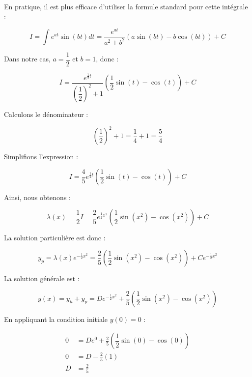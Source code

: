 \documentclass{article}
\begin{document}
En pratique, il est plus efficace d'utiliser la formule standard pour cette intégrale :

\begin{equation*}
I = \int e^{ a t } \sin( b t ) dt = \frac{ e^{ a t } }{ a^2 + b^2 } \left( a \sin( b t ) - b \cos( b t ) \right ) + C
\end{equation*}

Dans notre cas, \(a = \dfrac{1}{2}\) et \(b = 1\), donc :

\begin{equation*}
I = \frac{ e^{ \frac{1}{2} t } }{ \left( \dfrac{1}{2} \right)^2 + 1 } \left( \dfrac{1}{2} \sin( t ) - \cos( t ) \right ) + C
\end{equation*}

Calculons le dénominateur :

\begin{equation*}
\left( \dfrac{1}{2} \right)^2 + 1 = \dfrac{1}{4} + 1 = \dfrac{5}{4}
\end{equation*}

Simplifions l'expression :

\begin{equation*}
I = \frac{ 4 }{ 5 } e^{ \frac{1}{2} t } \left( \dfrac{1}{2} \sin( t ) - \cos( t ) \right ) + C
\end{equation*}

Ainsi, nous obtenons :

\begin{equation*}
\lambda(x) = \frac{1}{2} I = \frac{2}{5} e^{ \frac{1}{2} x^2 } \left( \dfrac{1}{2} \sin( x^2 ) - \cos( x^2 ) \right ) + C
\end{equation*}

La solution particulière est donc :

\begin{equation*}
y_p = \lambda(x) e^{ - \frac{1}{2} x^2 } = \frac{2}{5} \left( \dfrac{1}{2} \sin( x^2 ) - \cos( x^2 ) \right ) + C e^{ - \frac{1}{2} x^2 }
\end{equation*}

La solution générale est :

\begin{equation*}
y(x) = y_h + y_p = D e^{ - \frac{1}{2} x^2 } + \frac{2}{5} \left( \dfrac{1}{2} \sin( x^2 ) - \cos( x^2 ) \right )
\end{equation*}

En appliquant la condition initiale \(y(0) = 0\) :

\begin{align*}
0 &= D e^{ 0 } + \frac{2}{5} \left( \dfrac{1}{2} \sin( 0 ) - \cos( 0 ) \right ) \\
0 &= D - \frac{2}{5} (1) \\
D &= \frac{2}{5}
\end{align*}
\end{document}
